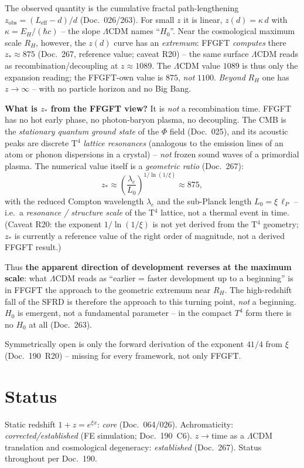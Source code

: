 The observed quantity is the cumulative fractal path-lengthening
$z_{\text{obs}} = (L_{\text{eff}}-d)/d$ (Doc.~026/263). For small $z$ it is linear,
$z(d) = \kappa\,d$ with $\kappa = E_H/(\hbar c)$ -- the slope $\Lambda$CDM names
\enquote{$H_0$}. Near the cosmological maximum scale $R_H$, however, the $z(d)$ curve
has an \emph{extremum}: FFGFT \emph{computes} there $z_*\approx 875$ (Doc.~267,
reference value; caveat R20) -- the same surface $\Lambda$CDM reads as
recombination/decoupling at $z\approx 1089$. The $\Lambda$CDM value $1089$ is thus
only the expansion reading; the FFGFT-own value is $875$, \emph{not} $1100$.
\emph{Beyond} $R_H$ one has $z\to\infty$ -- with no particle horizon and no Big Bang.

\textbf{What is $z_*$ from the FFGFT view?} It is \emph{not} a recombination time.
FFGFT has no hot early phase, no photon-baryon plasma, no decoupling. The CMB is the
\emph{stationary quantum ground state} of the $\Phi$ field (Doc.~025), and its acoustic
peaks are discrete T$^4$ \emph{lattice resonances} (analogous to the emission lines of
an atom or phonon dispersions in a crystal) -- \emph{not} frozen sound waves of a
primordial plasma. The numerical value itself is a \emph{geometric ratio} (Doc.~267):
\[
  z_* \approx \left(\frac{\lambda_e}{L_0}\right)^{1/\ln(1/\xi)} \approx 875,
\]
with the reduced Compton wavelength $\lambda_e$ and the sub-Planck length
$L_0=\xi\,\ell_P$ -- i.e.\ a \emph{resonance / structure scale} of the T$^4$ lattice,
not a thermal event in time. (Caveat R20: the exponent $1/\ln(1/\xi)$ is not yet derived
from the T$^4$ geometry; $z_*$ is currently a reference value of the right order of
magnitude, not a derived FFGFT result.)

Thus \textbf{the apparent direction of development reverses at the maximum scale}:
what $\Lambda$CDM reads as \enquote{earlier = faster development up to a beginning}
is in FFGFT the approach to the geometric extremum near $R_H$. The high-redshift fall
of the SFRD is therefore the approach to this turning point, \emph{not} a beginning.
$H_0$ is emergent, not a fundamental parameter -- in the compact $T^4$ form there is
no $H_0$ at all (Doc.~263).

Symmetrically open is only the forward derivation of the exponent $41/4$ from $\xi$
(Doc.~190~R20) -- missing for every framework, not only FFGFT.

\section*{Status}

Static redshift $1+z=e^{\xi x}$: \emph{core} (Doc.~064/026).
Achromaticity: \emph{corrected/established} (FE simulation; Doc.~190~C6).
$z\to$time as a $\Lambda$CDM translation and cosmological degeneracy:
\emph{established} (Doc.~267). Status throughout per Doc.~190.
